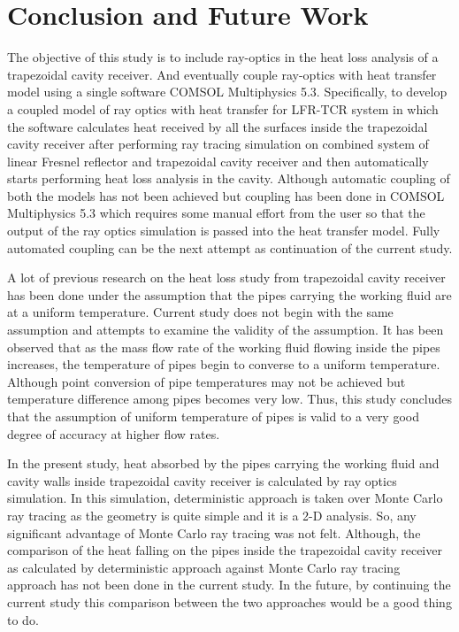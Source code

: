 \chapter{Conclusion and Future Work}
The objective of this study is to include ray-optics in the heat loss analysis of a trapezoidal cavity receiver. And eventually couple ray-optics with heat transfer model using a single software COMSOL Multiphysics 5.3. Specifically, to develop a coupled model of ray optics with heat transfer for LFR-TCR system in which the software calculates heat received by all the surfaces inside the trapezoidal cavity receiver after performing ray tracing simulation on combined system of linear Fresnel reflector and trapezoidal cavity receiver and then automatically starts performing heat loss analysis in the cavity. Although automatic coupling of both the models has not been achieved but coupling has been done in COMSOL Multiphysics 5.3 which requires some manual effort from the user so that the output of the ray optics simulation is passed into the heat transfer model. Fully automated coupling can be the next attempt as continuation of the current study.

A lot of previous research on the heat loss study from trapezoidal cavity receiver has been done under the assumption that the pipes carrying the working fluid are at a uniform temperature. Current study does not begin with the same assumption and attempts to examine the validity of the assumption. It has been observed that as the mass flow rate of the working fluid flowing inside the pipes increases, the temperature of pipes begin to converse to a uniform temperature. Although point conversion of pipe temperatures may not be achieved but temperature difference among pipes becomes very low. Thus, this study concludes that the assumption of uniform temperature of pipes is valid to a very good degree of accuracy at higher flow rates.

In the present study, heat absorbed by the pipes carrying the working fluid and cavity walls inside trapezoidal cavity receiver is calculated by ray optics simulation. In this simulation, deterministic approach is taken over Monte Carlo ray tracing as the geometry is quite simple and it is a 2-D analysis. So, any significant advantage of Monte Carlo ray tracing was not felt. Although, the comparison of the heat falling on the pipes inside the trapezoidal cavity receiver as calculated by deterministic approach against Monte Carlo ray tracing approach has not been done in the current study. In the future, by continuing the current study this comparison between the two approaches would be a good thing to do.

